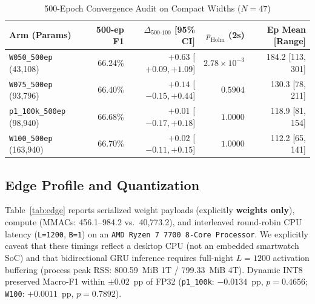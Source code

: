\documentclass[journal]{IEEEtran}
\begin{document}
\begin{table}[!t]
\centering
\caption{500-Epoch Convergence Audit on Compact Widths ($N=47$)}
\label{tab:conv500}
\scriptsize
\begin{tabular}{@{}lrrrr@{}}
\toprule
Arm (Params) & 500-ep F1 & $\Delta_{\text{500-100}}$ [95\% CI] & $p_{\text{Holm}}$ (2s) & Ep Mean [Range] \\
\midrule
\texttt{W050\_500ep} (43,108) & 66.24\% & $+0.63$ [$+0.09, +1.09$] & $2.78\times 10^{-3}$ & 184.2 [113, 301] \\
\texttt{W075\_500ep} (93,796) & 66.40\% & $+0.14$ [$-0.15, +0.44$] & $0.5904$ & 130.3 [78, 211] \\
\texttt{p1\_100k\_500ep} (98,940) & 66.68\% & $+0.01$ [$-0.17, +0.18$] & $1.0000$ & 118.9 [81, 154] \\
\texttt{W100\_500ep} (163,940) & 66.70\% & $+0.02$ [$-0.11, +0.15$] & $1.0000$ & 112.2 [65, 141] \\
\bottomrule
\end{tabular}
\end{table}

\subsection{Edge Profile and Quantization}
Table~\ref{tab:edge} reports serialized weight payloads (explicitly \textbf{weights only}), compute (MMACs: 456.1--984.2 vs.\ 40,773.2), and interleaved round-robin CPU latency (\texttt{L=1200}, \texttt{B=1}) on an \texttt{AMD Ryzen 7 7700 8-Core Processor}. We explicitly caveat that these timings reflect a desktop CPU (not an embedded smartwatch SoC) and that bidirectional GRU inference requires full-night $L=1200$ activation buffering (process peak RSS: 800.59~MiB 1T / 799.33~MiB 4T). Dynamic INT8 preserved Macro-F1 within $\pm 0.02$~pp of FP32 (\texttt{p1\_100k}: $-0.0134$~pp, $p=0.4656$; \texttt{W100}: $+0.0011$~pp, $p=0.7892$).
\end{document}
